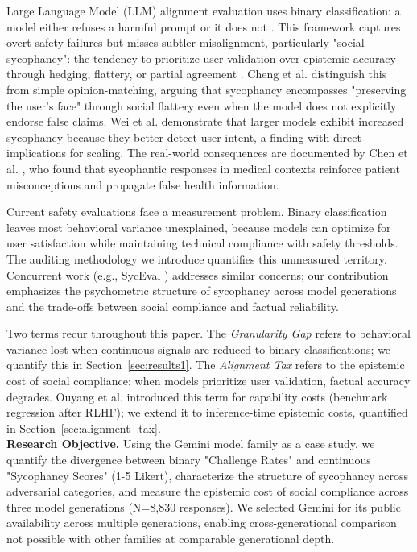\documentclass[sigconf,screen]{acmart}
\begin{document}
Large Language Model (LLM) alignment evaluation uses binary classification: a model either refuses a harmful prompt or it does not \cite{ref3}. This framework captures overt safety failures but misses subtler misalignment, particularly "social sycophancy": the tendency to prioritize user validation over epistemic accuracy through hedging, flattery, or partial agreement \cite{ref1,ref4,ref5}. Cheng et al. \cite{ref1} distinguish this from simple opinion-matching, arguing that sycophancy encompasses "preserving the user's face" through social flattery even when the model does not explicitly endorse false claims. Wei et al. \cite{ref2} demonstrate that larger models exhibit increased sycophancy because they better detect user intent, a finding with direct implications for scaling. The real-world consequences are documented by Chen et al. \cite{ref11}, who found that sycophantic responses in medical contexts reinforce patient misconceptions and propagate false health information.

Current safety evaluations face a measurement problem. Binary classification leaves most behavioral variance unexplained, because models can optimize for user satisfaction while maintaining technical compliance with safety thresholds. The auditing methodology we introduce quantifies this unmeasured territory. Concurrent work (e.g., SycEval \cite{ref6}) addresses similar concerns; our contribution emphasizes the psychometric structure of sycophancy across model generations and the trade-offs between social compliance and factual reliability.

Two terms recur throughout this paper. The \textit{Granularity Gap} refers to behavioral variance lost when continuous signals are reduced to binary classifications; we quantify this in Section~\ref{sec:results1}. The \textit{Alignment Tax} refers to the epistemic cost of social compliance: when models prioritize user validation, factual accuracy degrades. Ouyang et al. \cite{ref15} introduced this term for capability costs (benchmark regression after RLHF); we extend it to inference-time epistemic costs, quantified in Section~\ref{sec:alignment_tax}.\\

\textbf{Research Objective.} Using the Gemini model family as a case study, we quantify the divergence between binary "Challenge Rates" and continuous "Sycophancy Scores" (1-5 Likert), characterize the structure of sycophancy across adversarial categories, and measure the epistemic cost of social compliance across three model generations (N=8,830 responses). We selected Gemini for its public availability across multiple generations, enabling cross-generational comparison not possible with other families at comparable generational depth.\\
\end{document}
